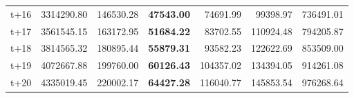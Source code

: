 \begin{table}[H]
\begin{tabular}{lrrrrrr}
t+16  & 3314290.80  & 146530.28  & \textbf{47543.00}  & 74691.99  & 99398.97  & 736491.01  \\
t+17  & 3561545.15  & 163172.95  & \textbf{51684.22}  & 83702.55  & 110924.48  & 794205.87  \\
t+18  & 3814565.32  & 180895.44  & \textbf{55879.31}  & 93582.23  & 122622.69  & 853509.00  \\
t+19  & 4072667.88  & 199760.00  & \textbf{60126.43}  & 104357.02  & 134394.05  & 914261.08  \\
t+20  & 4335019.45  & 220002.17  & \textbf{64427.28}  & 116040.77  & 145853.54  & 976268.64  \\

\bottomrule
\end{tabular}
\end{table}
